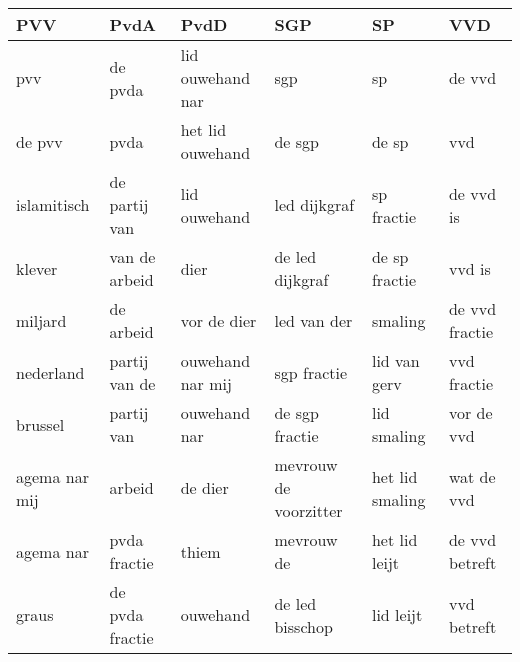 \begin{tabular}{llllll}
\toprule
           PVV &             PvdA &              PvdD &                    SGP &               SP &             VVD \\
\midrule
           pvv &          de pvda &  lid ouwehand nar &                    sgp &               sp &          de vvd \\
        de pvv &             pvda &  het lid ouwehand &                 de sgp &            de sp &             vvd \\
   islamitisch &    de partij van &      lid ouwehand &           led dijkgraf &       sp fractie &       de vvd is \\
        klever &    van de arbeid &              dier &        de led dijkgraf &    de sp fractie &          vvd is \\
       miljard &        de arbeid &       vor de dier &            led van der &          smaling &  de vvd fractie \\
     nederland &    partij van de &  ouwehand nar mij &            sgp fractie &     lid van gerv &     vvd fractie \\
       brussel &       partij van &      ouwehand nar &         de sgp fractie &      lid smaling &      vor de vvd \\
 agema nar mij &           arbeid &           de dier &  mevrouw de voorzitter &  het lid smaling &      wat de vvd \\
     agema nar &     pvda fractie &             thiem &             mevrouw de &    het lid leijt &  de vvd betreft \\
         graus &  de pvda fractie &          ouwehand &        de led bisschop &        lid leijt &     vvd betreft \\
\bottomrule
\end{tabular}

